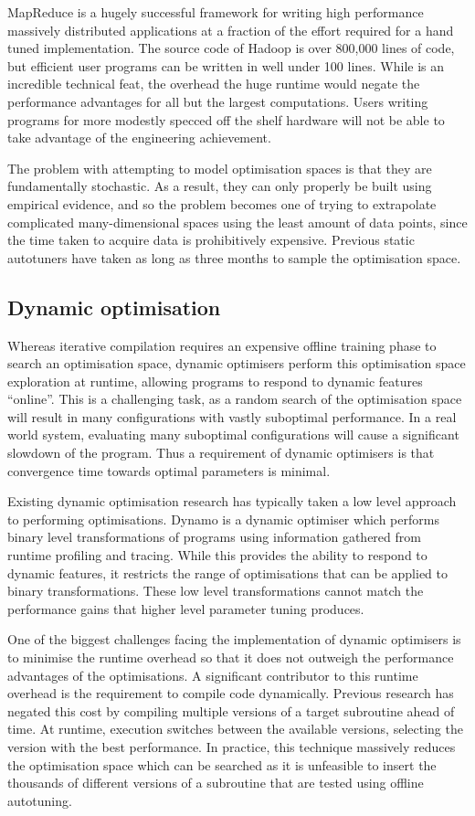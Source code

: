 MapReduce is a hugely successful framework for writing high
performance massively distributed applications at a fraction of the
effort required for a hand tuned implementation. The source code of
Hadoop is over 800,000 lines of code, but efficient user programs can
be written in well under 100 lines. While is an incredible technical
feat, the overhead the huge runtime would negate the performance
advantages for all but the largest computations. Users writing
programs for more modestly specced off the shelf hardware will not be
able to take advantage of the engineering achievement.

The problem with attempting to model optimisation spaces is that they
are fundamentally stochastic. As a result, they can only properly be
built using empirical evidence, and so the problem becomes one of
trying to extrapolate complicated many-dimensional spaces using the
least amount of data points, since the time taken to acquire data is
prohibitively expensive. Previous static autotuners have taken as long
as three months to sample the optimisation space.

\subsection{Dynamic optimisation}
Whereas iterative compilation requires an expensive offline training
phase to search an optimisation space, dynamic optimisers perform this
optimisation space exploration at runtime, allowing programs to
respond to dynamic features ``online''. This is a challenging task, as
a random search of the optimisation space will result in many
configurations with vastly suboptimal performance. In a real world
system, evaluating many suboptimal configurations will cause a
significant slowdown of the program. Thus a requirement of dynamic
optimisers is that convergence time towards optimal parameters is
minimal.

Existing dynamic optimisation research has typically taken a low level
approach to performing optimisations. Dynamo is a dynamic optimiser
which performs binary level transformations of programs using
information gathered from runtime profiling and tracing. While this
provides the ability to respond to dynamic features, it restricts the
range of optimisations that can be applied to binary
transformations. These low level transformations cannot match the
performance gains that higher level parameter tuning produces.

One of the biggest challenges facing the implementation of dynamic
optimisers is to minimise the runtime overhead so that it does not
outweigh the performance advantages of the optimisations. A
significant contributor to this runtime overhead is the requirement to
compile code dynamically. Previous research has negated this cost by
compiling multiple versions of a target subroutine ahead of time. At
runtime, execution switches between the available versions, selecting
the version with the best performance. In practice, this technique
massively reduces the optimisation space which can be searched as it
is unfeasible to insert the thousands of different versions of a
subroutine that are tested using offline autotuning.
